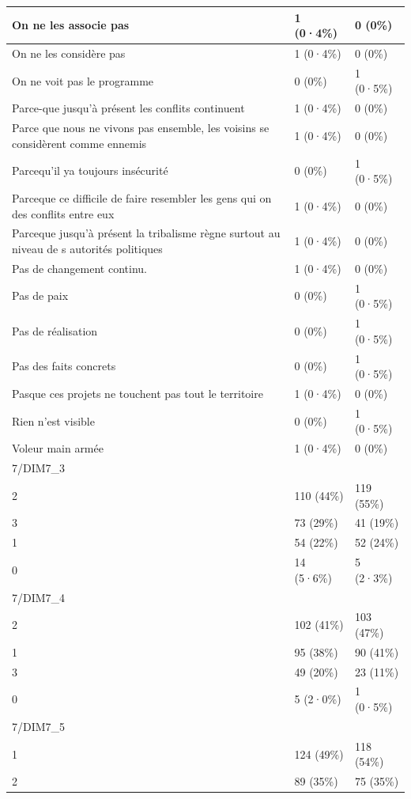 \documentclass[
]{book}
\begin{document}
\begin{tabular}{l|l|l}
\hline
On ne les associe pas & 1 (0·4\%) & 0 (0\%)\\
\hline
On ne les considère pas & 1 (0·4\%) & 0 (0\%)\\
\hline
On ne voit pas le programme & 0 (0\%) & 1 (0·5\%)\\
\hline
Parce-que jusqu'à présent les conflits continuent & 1 (0·4\%) & 0 (0\%)\\
\hline
Parce que nous ne vivons pas ensemble, les voisins se considèrent comme ennemis & 1 (0·4\%) & 0 (0\%)\\
\hline
Parcequ'il ya toujours insécurité & 0 (0\%) & 1 (0·5\%)\\
\hline
Parceque ce difficile de faire resembler les gens qui on des conflits entre eux & 1 (0·4\%) & 0 (0\%)\\
\hline
Parceque jusqu'à présent la tribalisme règne surtout au niveau de s autorités politiques & 1 (0·4\%) & 0 (0\%)\\
\hline
Pas de changement continu. & 1 (0·4\%) & 0 (0\%)\\
\hline
Pas de paix & 0 (0\%) & 1 (0·5\%)\\
\hline
Pas de réalisation & 0 (0\%) & 1 (0·5\%)\\
\hline
Pas des faits concrets & 0 (0\%) & 1 (0·5\%)\\
\hline
Pasque ces projets ne touchent pas tout le territoire & 1 (0·4\%) & 0 (0\%)\\
\hline
Rien n'est visible & 0 (0\%) & 1 (0·5\%)\\
\hline
Voleur main armée & 1 (0·4\%) & 0 (0\%)\\
\hline
7/DIM7\_3 &  & \\
\hline
2 & 110 (44\%) & 119 (55\%)\\
\hline
3 & 73 (29\%) & 41 (19\%)\\
\hline
1 & 54 (22\%) & 52 (24\%)\\
\hline
0 & 14 (5·6\%) & 5 (2·3\%)\\
\hline
7/DIM7\_4 &  & \\
\hline
2 & 102 (41\%) & 103 (47\%)\\
\hline
1 & 95 (38\%) & 90 (41\%)\\
\hline
3 & 49 (20\%) & 23 (11\%)\\
\hline
0 & 5 (2·0\%) & 1 (0·5\%)\\
\hline
7/DIM7\_5 &  & \\
\hline
1 & 124 (49\%) & 118 (54\%)\\
\hline
2 & 89 (35\%) & 75 (35\%)\\
\hline

\end{tabular}
\end{document}
